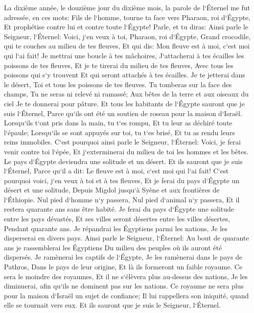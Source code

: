 \verse La dixième année, le douzième jour du dixième mois, la parole de l`Éternel me fut adressée, en ces mots: 
\verse Fils de l`homme, tourne ta face vers Pharaon, roi d`Égypte, Et prophétise contre lui et contre toute l`Égypte! 
\verse Parle, et tu diras: Ainsi parle le Seigneur, l`Éternel: Voici, j`en veux à toi, Pharaon, roi d`Égypte, Grand crocodile, qui te couches au milieu de tes fleuves, Et qui dis: Mon fleuve est à moi, c`est moi qui l`ai fait! 
\verse Je mettrai une boucle à tes mâchoires, J`attacherai à tes écailles les poissons de tes fleuves, Et je te tirerai du milieu de tes fleuves, Avec tous les poissons qui s`y trouvent Et qui seront attachés à tes écailles. 
\verse Je te jetterai dans le désert, Toi et tous les poissons de tes fleuves. Tu tomberas sur la face des champs, Tu ne seras ni relevé ni ramassé; Aux bêtes de la terre et aux oiseaux du ciel Je te donnerai pour pâture. 
\verse Et tous les habitants de l`Égypte sauront que je suis l`Éternel, Parce qu`ils ont été un soutien de roseau pour la maison d`Israël. 
\verse Lorsqu`ils t`ont pris dans la main, tu t`es rompu, Et tu leur as déchiré toute l`épaule; Lorsqu`ils se sont appuyés sur toi, tu t`es brisé, Et tu as rendu leurs reins immobiles. 
\verse C`est pourquoi ainsi parle le Seigneur, l`Éternel: Voici, je ferai venir contre toi l`épée, Et j`exterminerai du milieu de toi les hommes et les bêtes. 
\verse Le pays d`Égypte deviendra une solitude et un désert. Et ils sauront que je suis l`Éternel, Parce qu`il a dit: Le fleuve est à moi, c`est moi qui l`ai fait! 
\verse C`est pourquoi voici, j`en veux à toi et à tes fleuves, Et je ferai du pays d`Égypte un désert et une solitude, Depuis Migdol jusqu`à Syène et aux frontières de l`Éthiopie. 
\verse Nul pied d`homme n`y passera, Nul pied d`animal n`y passera, Et il restera quarante ans sans être habité. 
\verse Je ferai du pays d`Égypte une solitude entre les pays dévastés, Et ses villes seront désertes entre les villes désertes, Pendant quarante ans. Je répandrai les Égyptiens parmi les nations, Je les disperserai en divers pays. 
\verse Ainsi parle le Seigneur, l`Éternel: Au bout de quarante ans je rassemblerai les Égyptiens Du milieu des peuples où ils auront été dispersés. 
\verse Je ramènerai les captifs de l`Égypte, Je les ramènerai dans le pays de Pathros, Dans le pays de leur origine, Et là ils formeront un faible royaume. 
\verse Ce sera le moindre des royaumes, Et il ne s`élèvera plus au-dessus des nations, Je les diminuerai, afin qu`ils ne dominent pas sur les nations. 
\verse Ce royaume ne sera plus pour la maison d`Israël un sujet de confiance; Il lui rappellera son iniquité, quand elle se tournait vers eux. Et ils sauront que je suis le Seigneur, l`Éternel. 
